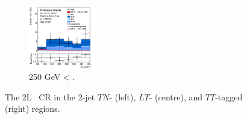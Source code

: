 \begin{figure}[h!]
\begin{subfigure}[b]{\textwidth}
        \includegraphics[width=0.32\textwidth]{Images/VH/Own_fit/postfit_VHcc/Region_distmBB_BMin250_DCRHigh_J2_TTypett_T2_L2_Y6051_GlobalFit_conditionnal_mu1.png}
        \caption{250 GeV < \ptv.}
        \label{fig:plots_VHcc_2L_250_CRH_2J}
    \end{subfigure}
    \caption{The 2L \highdr\ CR in the 2-jet $TN$- (left), $LT$- (centre), and $TT$-tagged (right) regions.}
    \label{fig:plots_VHcc_2L_CRH_2J}
\end{figure}

\vspace*{\fill} \newpage
\vspace*{\fill} 

